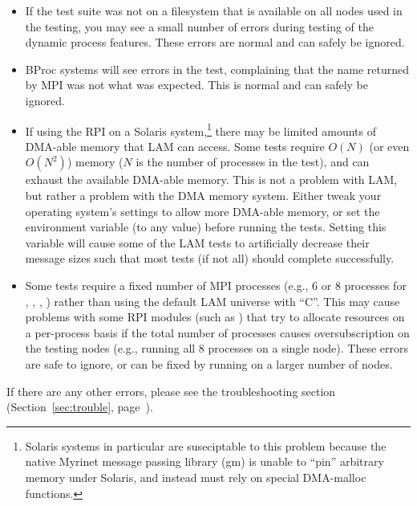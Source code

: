 \begin{itemize}
\item If the test suite was not on a filesystem that is available on
  all nodes used in the testing, you may see a small number of errors
  during testing of the dynamic process features.  These errors are
  normal and can safely be ignored.

\item BProc systems will see errors in the  test,
  complaining that the name returned by MPI was not what was
  expected.  This is normal and can safely be ignored.
  
\item If using the  RPI on a Solaris system,\footnote{Solaris
    systems in particular are suseciptable to this problem because the
    native Myrinet message passing library (gm) is unable to ``pin''
    arbitrary memory under Solaris, and instead must rely on special
    DMA-malloc functions.} there may be limited amounts of DMA-able
  memory that LAM can access.  Some tests require $O(N)$ (or even
  $O(N^2)$) memory ($N$ is the number of processes in the test), and
  can exhaust the available DMA-able memory.  This is not a problem
  with LAM, but rather a problem with the DMA memory system.  Either
  tweak your operating system's settings to allow more DMA-able
  memory, or set the environment variable
   (to any value) before
  running the tests.  Setting this variable will cause some of the LAM
  tests to artificially decrease their message sizes such that most
  tests (if not all) should complete successfully.
  
\item Some tests require a fixed number of MPI processes (e.g., 6 or 8
  processes for , , , )
  rather than using the default LAM universe with ``C''.  This may
  cause problems with some RPI modules (such as ) that try
  to allocate resources on a per-process basis if the total number of
  processes causes oversubscription on the testing nodes (e.g.,
  running all 8 processes on a single node).  These errors are safe to
  ignore, or can be fixed by running on a larger number of nodes.
\end{itemize}

If there are any other errors, please see the troubleshooting section
(Section~\ref{sec:trouble}, page~\pageref{sec:trouble}).


